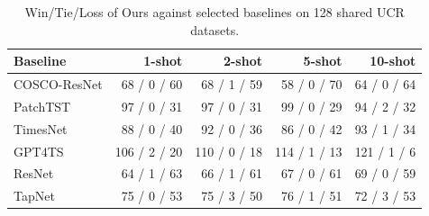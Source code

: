 \begin{table}[t]
\centering
\caption{Win/Tie/Loss of Ours against selected baselines on 128 shared UCR datasets.}
\label{tab:ucr_fewshot_paper_current-paper-wtl}
\begin{tabular}{lrrrr}
\toprule
Baseline & 1-shot & 2-shot & 5-shot & 10-shot \\
\midrule
COSCO-ResNet & 68 / 0 / 60 & 68 / 1 / 59 & 58 / 0 / 70 & 64 / 0 / 64 \\
PatchTST & 97 / 0 / 31 & 97 / 0 / 31 & 99 / 0 / 29 & 94 / 2 / 32 \\
TimesNet & 88 / 0 / 40 & 92 / 0 / 36 & 86 / 0 / 42 & 93 / 1 / 34 \\
GPT4TS & 106 / 2 / 20 & 110 / 0 / 18 & 114 / 1 / 13 & 121 / 1 / 6 \\
ResNet & 64 / 1 / 63 & 66 / 1 / 61 & 67 / 0 / 61 & 69 / 0 / 59 \\
TapNet & 75 / 0 / 53 & 75 / 3 / 50 & 76 / 1 / 51 & 72 / 3 / 53 \\
\bottomrule
\end{tabular}
\end{table}
